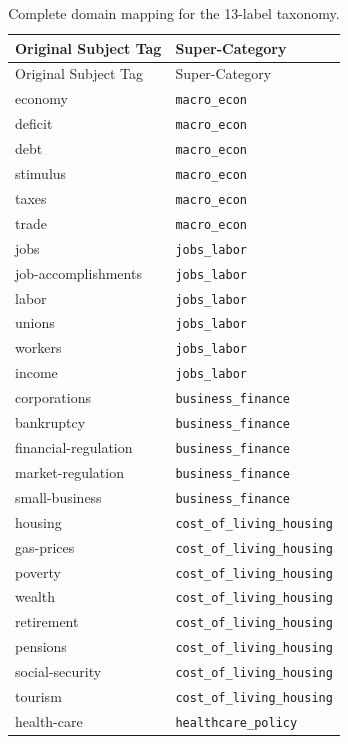 \begin{longtable}{ll}
\caption{Complete domain mapping for the 13-label taxonomy.}
\label{tab:domain_mapping_13}\\
\toprule
Original Subject Tag & Super-Category \\
\midrule
\endfirsthead
\toprule
Original Subject Tag & Super-Category \\
\midrule
\endhead
\bottomrule
\endfoot
economy & \texttt{macro\_econ} \\
deficit & \texttt{macro\_econ} \\
debt & \texttt{macro\_econ} \\
stimulus & \texttt{macro\_econ} \\
taxes & \texttt{macro\_econ} \\
trade & \texttt{macro\_econ} \\
\midrule
jobs & \texttt{jobs\_labor} \\
job-accomplishments & \texttt{jobs\_labor} \\
labor & \texttt{jobs\_labor} \\
unions & \texttt{jobs\_labor} \\
workers & \texttt{jobs\_labor} \\
income & \texttt{jobs\_labor} \\
\midrule
corporations & \texttt{business\_finance} \\
bankruptcy & \texttt{business\_finance} \\
financial-regulation & \texttt{business\_finance} \\
market-regulation & \texttt{business\_finance} \\
small-business & \texttt{business\_finance} \\
\midrule
housing & \texttt{cost\_of\_living\_housing} \\
gas-prices & \texttt{cost\_of\_living\_housing} \\
poverty & \texttt{cost\_of\_living\_housing} \\
wealth & \texttt{cost\_of\_living\_housing} \\
retirement & \texttt{cost\_of\_living\_housing} \\
pensions & \texttt{cost\_of\_living\_housing} \\
social-security & \texttt{cost\_of\_living\_housing} \\
tourism & \texttt{cost\_of\_living\_housing} \\
\midrule
health-care & \texttt{healthcare\_policy} \\

\end{longtable}
